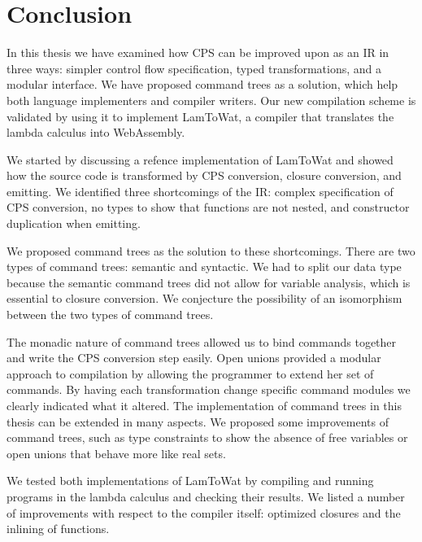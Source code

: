 
\chapter{\label{chap:conclusion}Conclusion}

In this thesis we have examined how CPS can be improved upon as an IR in three ways: simpler control flow specification, typed transformations, and a modular interface. We have proposed command trees as a solution, which help both language implementers and compiler writers. Our new compilation scheme is validated by using it to implement LamToWat, a compiler that translates the lambda calculus into WebAssembly.

We started by discussing a refence implementation of LamToWat and showed how the source code is transformed by CPS conversion, closure conversion, and emitting. We identified three shortcomings of the IR: complex specification of CPS conversion, no types to show that functions are not nested, and constructor duplication when emitting.

We proposed command trees as the solution to these shortcomings. There are two types of command trees: semantic and syntactic. We had to split our data type because the semantic command trees did not allow for variable analysis, which is essential to closure conversion. We conjecture the possibility of an isomorphism between the two types of command trees.

The monadic nature of command trees allowed us to bind commands together and write the CPS conversion step easily. Open unions provided a modular approach to compilation by allowing the programmer to extend her set of commands. By having each transformation change specific command modules we clearly indicated what it altered. The implementation of command trees in this thesis can be extended in many aspects. We proposed some improvements of command trees, such as type constraints to show the absence of free variables or open unions that behave more like real sets.

We tested both implementations of LamToWat by compiling and running programs in the lambda calculus and checking their results. We listed a number of improvements with respect to the compiler itself: optimized closures and the inlining of functions.